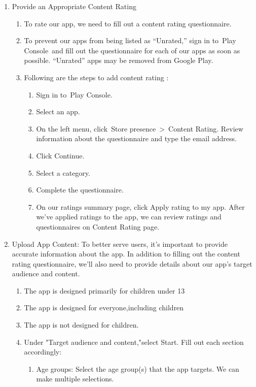 \begin{enumerate}
\begin{enumerate}
    \end{enumerate}
    \item Provide an Appropriate Content Rating
    \begin{enumerate}
        \item To rate our app, we need to fill out a content rating questionnaire. 
        \item To prevent  our apps from being listed as “Unrated,” sign in to Play Console and fill out the questionnaire for each of our apps as soon as possible. “Unrated” apps may be removed from Google Play.
        \item Following are the steps to add content rating :
        \begin{enumerate}
            \item Sign in to Play Console.
            \item Select an app.
            \item On the left menu, click Store presence > Content Rating.
            Review information about the questionnaire and type the email address.
            \item Click Continue.
            \item Select a category.
            \item Complete the questionnaire.
            \item On our ratings summary page, click Apply rating to my app. After we’ve applied ratings to the app, we can review ratings and questionnaires on Content Rating page. 
        \end{enumerate}
    \end{enumerate}
    \item Upload App Content: To better serve users, it's important to provide accurate information about the app. In addition to filling out the content rating questionnaire, we'll also need to provide details about our app's target audience and content. 
    \begin{enumerate}
        \item The app is designed primarily for children under 13
        \item The app is designed for everyone,including children
        \item The  app is not designed for children.
        \item Under "Target audience and content,"select Start. Fill out each section accordingly:
        \begin{enumerate}
            \item Age groups: Select the age group(s) that the app targets. We can make multiple selections.

\end{enumerate}
\end{enumerate}
\end{enumerate}
